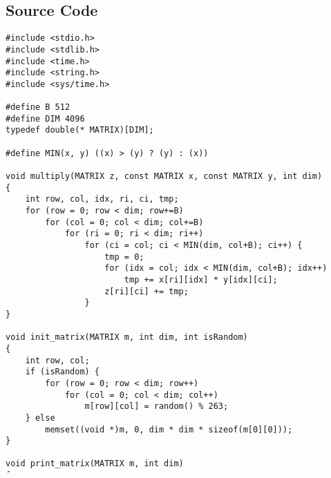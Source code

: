 \documentclass[a4paper, 11pt]{article}
\begin{document}
\subsection{Source Code}
\begin{verbatim}
#include <stdio.h>
#include <stdlib.h>
#include <time.h>
#include <string.h>
#include <sys/time.h>

#define B 512
#define DIM 4096
typedef double(* MATRIX)[DIM];

#define MIN(x, y) ((x) > (y) ? (y) : (x))

void multiply(MATRIX z, const MATRIX x, const MATRIX y, int dim)
{
    int row, col, idx, ri, ci, tmp;
    for (row = 0; row < dim; row+=B)
        for (col = 0; col < dim; col+=B)
            for (ri = 0; ri < dim; ri++)
                for (ci = col; ci < MIN(dim, col+B); ci++) {
                    tmp = 0;
                    for (idx = col; idx < MIN(dim, col+B); idx++)
                        tmp += x[ri][idx] * y[idx][ci];
                    z[ri][ci] += tmp;
                }
}

void init_matrix(MATRIX m, int dim, int isRandom)
{
    int row, col;
    if (isRandom) {
        for (row = 0; row < dim; row++)
            for (col = 0; col < dim; col++)
                m[row][col] = random() % 263;
    } else
        memset((void *)m, 0, dim * dim * sizeof(m[0][0]));
}

void print_matrix(MATRIX m, int dim)
{
    int row, col;
    for (row = 0; row < dim; row++) {
        for (col = 0; col < dim; col++)
            printf("%f ", m[row][col]);
        printf("\n");
    }
}

int main(void)
{
    srandom(time(NULL));
#if 1
    MATRIX x = (MATRIX)malloc(DIM*DIM*sizeof(double));
    MATRIX y = (MATRIX)malloc(DIM*DIM*sizeof(double));
    MATRIX z = (MATRIX)malloc(DIM*DIM*sizeof(double));
    init_matrix(x, DIM, 1);
    init_matrix(y, DIM, 1);
    init_matrix(z, DIM, 0);
#else
    double x[DIM][DIM] = {
        {1, 2},
        {3, 4}
    };
    double y[DIM][DIM] = {
        {4, 3},
        {2, 1}
    };
    double z[DIM][DIM] = {
        {0, },
    };
#endif
    struct timeval start, end;
    gettimeofday(&start, NULL);
    multiply(z, x, y, DIM);
    gettimeofday(&end, NULL);
    int time = (int)(end.tv_sec-start.tv_sec);
    unsigned long long opts = (unsigned long long)DIM*DIM*(2*DIM-1);
    double speed = opts / (double)(time * 1000000);
    printf("%d matrix multiply\n", DIM);
    printf("time : %ds\tspeed: %.2f MFLOPS\n", time, speed);
#if 0
    print_matrix(x, DIM);
    print_matrix(y, DIM);
    print_matrix(z, DIM);
#endif
    return 0;
}
\end{verbatim}
\end{document}
